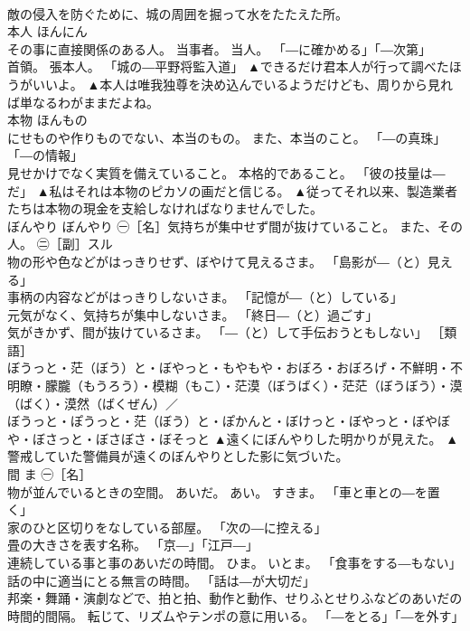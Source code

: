 \documentclass[8pt]{extreport}
\begin{document}
\begin{CJK}{UTF8}{min}
\\	敵の侵入を防ぐために、城の周囲を掘って水をたたえた所。	
\\	本人	ほんにん	
\\	その事に直接関係のある人。 当事者。 当人。 「―に確かめる」「―次第」 
\\	首領。 張本人。 「城の―平野将監入道」	▲できるだけ君本人が行って調べたほうがいいよ。 ▲本人は唯我独尊を決め込んでいるようだけども、周りから見れば単なるわがままだよね。
\\	本物	ほんもの	
\\	にせものや作りものでない、本当のもの。 また、本当のこと。 「―の真珠」「―の情報」 
\\	見せかけでなく実質を備えていること。 本格的であること。 「彼の技量は―だ」	▲私はそれは本物のピカソの画だと信じる。 ▲従ってそれ以来、製造業者たちは本物の現金を支給しなければなりませんでした。
\\	ぼんやり	ぼんやり	㊀［名］気持ちが集中せず間が抜けていること。 また、その人。 ㊁［副］スル 
\\	物の形や色などがはっきりせず、ぼやけて見えるさま。 「島影が―（と）見える」 
\\	事柄の内容などがはっきりしないさま。 「記憶が―（と）している」 
\\	元気がなく、気持ちが集中しないさま。 「終日―（と）過ごす」 
\\	気がきかず、間が抜けているさま。 「―（と）して手伝おうともしない」 ［類語］ 
\\	ぼうっと・茫（ぼう）と・ぼやっと・もやもや・おぼろ・おぼろげ・不鮮明・不明瞭・朦朧（もうろう）・模糊（もこ）・茫漠（ぼうばく）・茫茫（ぼうぼう）・漠（ばく）・漠然（ばくぜん）／
\\	ぼうっと・ぽうっと・茫（ぼう）と・ぽかんと・ぼけっと・ぼやっと・ぼやぼや・ぼさっと・ぼさぼさ・ぼそっと	▲遠くにぼんやりした明かりが見えた。 ▲警戒していた警備員が遠くのぼんやりとした影に気づいた。
\\	間	ま	㊀［名］ 
\\	物が並んでいるときの空間。 あいだ。 あい。 すきま。 「車と車との―を置く」 
\\	家のひと区切りをなしている部屋。 「次の―に控える」 
\\	畳の大きさを表す名称。 「京―」「江戸―」 
\\	連続している事と事のあいだの時間。 ひま。 いとま。 「食事をする―もない」 
\\	話の中に適当にとる無言の時間。 「話は―が大切だ」 
\\	邦楽・舞踊・演劇などで、拍と拍、動作と動作、せりふとせりふなどのあいだの時間的間隔。 転じて、リズムやテンポの意に用いる。 「―をとる」「―を外す」 

\end{CJK}
\end{document}

